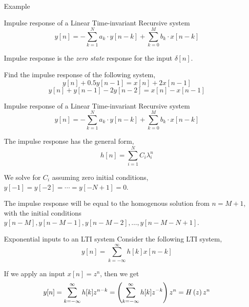 \documentclass[aspectratio=169]{beamer}
\def\lp{\ensuremath\left(}
\def\rp{\ensuremath\right)}
\begin{document}
\begin{frame}[t]{Example}
\end{frame}


\begin{frame}[t]{Impulse response of a Linear Time-invariant Recursive system}
\[ y[n] = -\sum_{k=1}^N a_k \cdot y[n - k] + \sum_{k=0}^{M} b_k \cdot x[n-k] \]

Impulse response is the \textit{zero state} response for the input $\delta[n]$. 

\vspace{0.5cm}
Find the impulse response of the following system,
\[ y[n] + 0.5 y[n-1] = x[n] + 2x[n-1] \]
\[ y[n] + y[n-1] - 2 y[n-2] = x[n] - x[n-1] \]
\end{frame}


\begin{frame}[t]{}
\end{frame}


\begin{frame}[t]{Impulse response of a Linear Time-invariant Recursive system}
\[ y[n] = -\sum_{k=1}^N a_k \cdot y[n - k] + \sum_{k=0}^{M} b_k \cdot x[n-k] \]

The impulse response has the general form,
\[ h[n] = \sum_{i=1}^{N} C_i \lambda_i^n \]

We solve for $C_i$ assuming zero initial conditions, $y[-1] = y[-2] = \cdots = y[-N+1] = 0$. \vspace{0.5cm}

The impulse response will be equal to the homogenous solution from $n = M + 1$, with the initial conditions $y[n-M], y[n-M-1], y[n-M-2], \ldots , y[n-M-N+1]$.
\end{frame}


\begin{frame}[t]{}
\end{frame}


\begin{frame}[t]{Exponential inputs to an LTI system}
Consider the following LTI system,
\[ y[n] = \sum_{k=-\infty}^\infty h[k] x[n-k] \]

If we apply an input $x[n] = z^n$, then we get
\[ y[n] = \sum_{k=-\infty}^\infty h[k] z^{n-k} = \lp \sum_{k=-\infty}^\infty h[k] z^{-k} \rp z^n = H\lp z \rp z^n \]
\end{frame}
\end{document}
